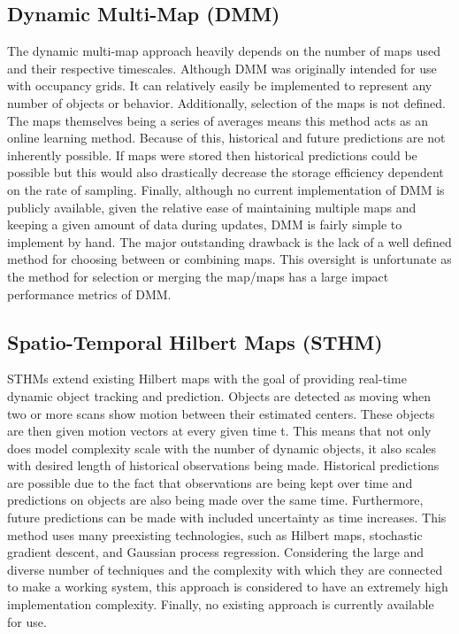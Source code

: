   \subsection { Dynamic Multi-Map (DMM) }
  The dynamic multi-map approach heavily depends on the number of maps used and their
  respective timescales. Although DMM was originally intended for use with
  occupancy grids. It can relatively easily be implemented to represent any
  number of objects or behavior. Additionally, selection of the maps is not
  defined. The maps themselves being a series of averages means this method acts as
  an online learning method. Because of this, historical and future predictions
  are not inherently possible. If maps were stored then historical predictions
  could be possible but this would also drastically decrease the storage
  efficiency dependent on the rate of sampling. Finally, although no current
  implementation of DMM is publicly available, given the relative ease of
  maintaining multiple maps and keeping a given amount of data during updates,
  DMM is fairly simple to implement by hand. The major outstanding drawback
  is the lack of a well defined method for choosing between or combining maps.
  This oversight is unfortunate as the method for selection or merging the
  map/maps has a large impact performance metrics of DMM. \\

  \subsection{ Spatio-Temporal Hilbert Maps (STHM) }
  STHMs extend existing Hilbert maps with the goal of providing real-time
  dynamic object tracking and prediction. Objects are detected as moving when
  two or more scans show motion between their estimated centers. These objects
  are then given motion vectors at every given time t. This means that not
  only does model complexity scale with the number of dynamic objects, it also
  scales with desired length of historical observations being made.
  Historical predictions are possible due to the
  fact that observations are being kept over time and predictions on objects
  are also being made over the same time.
  Furthermore, future predictions can be made with included uncertainty as
  time increases. This method uses many preexisting technologies, such
  as Hilbert maps, stochastic gradient descent, and Gaussian process regression.
  Considering the large and diverse number of techniques and the complexity with
  which they are connected to make a working system, this approach is considered
  to have an extremely high implementation complexity. Finally, no existing
  approach is currently available for use. \\


